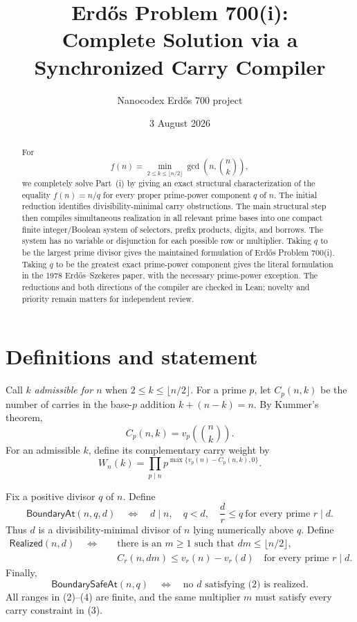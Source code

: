 \documentclass[11pt]{article}
\title{Erd\H{o}s Problem 700(i):\\
Complete Solution via a Synchronized Carry Compiler}
\author{Nanocodex Erd\H{o}s 700 project}
\date{3 August 2026}
\theoremstyle{remark}
\newcommand{\choosef}[2]{\binom{#1}{#2}}
\newcommand{\BoundaryAt}{\mathsf{BoundaryAt}}
\newcommand{\Realized}{\mathsf{Realized}}
\newcommand{\BoundarySafeAt}{\mathsf{BoundarySafeAt}}
\begin{document}
\maketitle

\begin{abstract}
For
\[
 f(n)=\min_{2\leq k\leq \lfloor n/2\rfloor}
       \gcd\!\left(n,\choosef nk\right),
\]
we completely solve Part~(i) by giving an exact structural characterization
of the equality $f(n)=n/q$
for every proper prime-power component $q$ of $n$.  The initial reduction
identifies divisibility-minimal carry obstructions.  The main structural step
then compiles simultaneous realization in all relevant prime bases into one
compact finite integer/Boolean system of selectors, prefix products, digits,
and borrows.  The system has no variable or disjunction for each possible
row or multiplier.  Taking $q$ to be the largest prime divisor gives the
maintained formulation of Erd\H{o}s Problem 700(i).  Taking $q$ to be the
greatest exact prime-power component gives the literal formulation in the
1978 Erd\H{o}s--Szekeres paper, with the necessary prime-power exception.
The reductions and both directions of the compiler are checked in Lean;
novelty and priority remain matters for independent review.
\end{abstract}

\section{Definitions and statement}

Call $k$ \emph{admissible for $n$} when
$2\leq k\leq\lfloor n/2\rfloor$.  For a prime $p$, let
$C_p(n,k)$ be the number of carries in the base-$p$ addition
$k+(n-k)=n$.  By Kummer's theorem,
\[
 C_p(n,k)=v_p\!\left(\choosef nk\right).
\]
For an admissible $k$, define its complementary carry weight by
\[
 W_n(k)=\prod_{p\mid n}p^{\max\{v_p(n)-C_p(n,k),0\}}.       \tag{1}
\]

Fix a positive divisor $q$ of $n$.  Define
\[
 \BoundaryAt(n,q,d)
 \quad\Longleftrightarrow\quad
 d\mid n,\quad q<d,\quad
 \frac d r\leq q\ \text{for every prime }r\mid d.          \tag{2}
\]
Thus $d$ is a divisibility-minimal divisor of $n$ lying numerically above
$q$.  Define
\begin{equation}
 \begin{split}
 \Realized(n,d)\quad\Longleftrightarrow\quad
 &\text{there is an }m\geq1\text{ such that }dm\leq\lfloor n/2\rfloor,\\
 &C_r(n,dm)\leq v_r(n)-v_r(d)
   \quad\text{for every prime }r\mid d.
 \end{split}
\tag{3}
\end{equation}
Finally,
\[
 \BoundarySafeAt(n,q)
 \quad\Longleftrightarrow\quad
 \text{no }d\text{ satisfying (2) is realized}.            \tag{4}
\]
All ranges in (2)--(4) are finite, and the same multiplier $m$ must satisfy
every carry constraint in (3).
\end{document}
